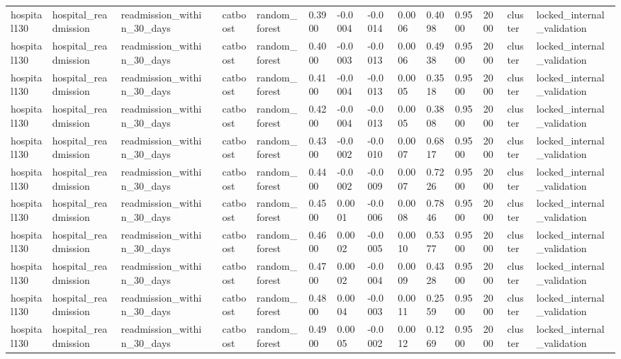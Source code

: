 \begin{tabular}{lllllllllllllll}
hospital130 & hospital\_readmission & readmission\_within\_30\_days &  & catboost & random\_forest & 0.3900 & -0.0004 & -0.0014 & 0.0006 & 0.4098 & 0.9500 & 2000 & cluster & locked\_internal\_validation \\
hospital130 & hospital\_readmission & readmission\_within\_30\_days &  & catboost & random\_forest & 0.4000 & -0.0003 & -0.0013 & 0.0006 & 0.4938 & 0.9500 & 2000 & cluster & locked\_internal\_validation \\
hospital130 & hospital\_readmission & readmission\_within\_30\_days &  & catboost & random\_forest & 0.4100 & -0.0004 & -0.0013 & 0.0005 & 0.3518 & 0.9500 & 2000 & cluster & locked\_internal\_validation \\
hospital130 & hospital\_readmission & readmission\_within\_30\_days &  & catboost & random\_forest & 0.4200 & -0.0004 & -0.0013 & 0.0005 & 0.3808 & 0.9500 & 2000 & cluster & locked\_internal\_validation \\
hospital130 & hospital\_readmission & readmission\_within\_30\_days &  & catboost & random\_forest & 0.4300 & -0.0002 & -0.0010 & 0.0007 & 0.6817 & 0.9500 & 2000 & cluster & locked\_internal\_validation \\
hospital130 & hospital\_readmission & readmission\_within\_30\_days &  & catboost & random\_forest & 0.4400 & -0.0002 & -0.0009 & 0.0007 & 0.7226 & 0.9500 & 2000 & cluster & locked\_internal\_validation \\
hospital130 & hospital\_readmission & readmission\_within\_30\_days &  & catboost & random\_forest & 0.4500 & 0.0001 & -0.0006 & 0.0008 & 0.7846 & 0.9500 & 2000 & cluster & locked\_internal\_validation \\
hospital130 & hospital\_readmission & readmission\_within\_30\_days &  & catboost & random\_forest & 0.4600 & 0.0002 & -0.0005 & 0.0010 & 0.5377 & 0.9500 & 2000 & cluster & locked\_internal\_validation \\
hospital130 & hospital\_readmission & readmission\_within\_30\_days &  & catboost & random\_forest & 0.4700 & 0.0002 & -0.0004 & 0.0009 & 0.4328 & 0.9500 & 2000 & cluster & locked\_internal\_validation \\
hospital130 & hospital\_readmission & readmission\_within\_30\_days &  & catboost & random\_forest & 0.4800 & 0.0004 & -0.0003 & 0.0011 & 0.2559 & 0.9500 & 2000 & cluster & locked\_internal\_validation \\
hospital130 & hospital\_readmission & readmission\_within\_30\_days &  & catboost & random\_forest & 0.4900 & 0.0005 & -0.0002 & 0.0012 & 0.1269 & 0.9500 & 2000 & cluster & locked\_internal\_validation \\

\end{tabular}
